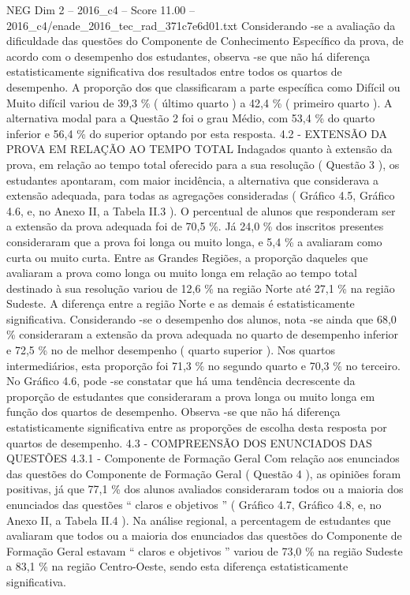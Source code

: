 \begin{textsample}{NEG Dim 2 – 2016\_c4 – Score 11.00 – 2016\_c4/enade\_2016\_tec\_rad\_371c7e6d01.txt}
Considerando -se a avaliação da dificuldade das questões do Componente de Conhecimento Específico da prova, de acordo com o desempenho dos estudantes, observa -se que não há diferença estatisticamente significativa dos resultados entre todos os quartos de desempenho.
A proporção dos que classificaram a parte específica como Difícil ou Muito difícil variou de 39,3 \% ( último quarto ) a 42,4 \% ( primeiro quarto ).
A alternativa modal para a Questão 2 foi o grau Médio, com 53,4 \% do quarto inferior e 56,4 \% do superior optando por esta resposta. 4.2 - EXTENSÃO DA PROVA EM RELAÇÃO AO TEMPO TOTAL Indagados quanto à extensão da prova, em relação ao tempo total oferecido para a sua resolução ( Questão 3 ), os estudantes apontaram, com maior incidência, a alternativa que considerava a extensão adequada, para todas as agregações consideradas ( Gráfico 4.5, Gráfico 4.6, e, no Anexo II, a Tabela II.3 ).
O percentual de alunos que responderam ser a extensão da prova adequada foi de 70,5 \%.
Já 24,0 \% dos inscritos presentes consideraram que a prova foi longa ou muito longa, e 5,4 \% a avaliaram como curta ou muito curta.
Entre as Grandes Regiões, a proporção daqueles que avaliaram a prova como longa ou muito longa em relação ao tempo total destinado à sua resolução variou de 12,6 \% na região Norte até 27,1 \% na região Sudeste.
A diferença entre a região Norte e as demais é estatisticamente significativa.
Considerando -se o desempenho dos alunos, nota -se ainda que 68,0 \% consideraram a extensão da prova adequada no quarto de desempenho inferior e 72,5 \% no de melhor desempenho ( quarto superior ).
Nos quartos intermediários, esta proporção foi 71,3 \% no segundo quarto e 70,3 \% no terceiro.
No Gráfico 4.6, pode -se constatar que há uma tendência decrescente da proporção de estudantes que consideraram a prova longa ou muito longa em função dos quartos de desempenho.
Observa -se que não há diferença estatisticamente significativa entre as proporções de escolha desta resposta por quartos de desempenho. 4.3 - COMPREENSÃO DOS ENUNCIADOS DAS QUESTÕES 4.3.1 - Componente de Formação Geral Com relação aos enunciados das questões do Componente de Formação Geral ( Questão 4 ), as opiniões foram positivas, já que 77,1 \% dos alunos avaliados consideraram todos ou a maioria dos enunciados das questões “ claros e objetivos ” ( Gráfico 4.7, Gráfico 4.8, e, no Anexo II, a Tabela II.4 ).
Na análise regional, a percentagem de estudantes que avaliaram que todos ou a maioria dos enunciados das questões do Componente de Formação Geral estavam “ claros e objetivos ” variou de 73,0 \% na região Sudeste a 83,1 \% na região Centro-Oeste, sendo esta diferença estatisticamente significativa.

\end{textsample}

